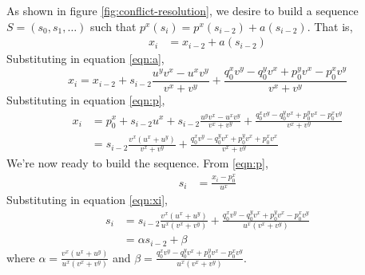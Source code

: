 \documentclass{egpubl}
\begin{document}
As shown in figure \ref{fig:conflict-resolution}, we desire to build a sequence $S=(s_0, s_1, \dots)$ such that $p^x(s_i) = p^x(s_{i-2}) + a(s_{i-2})$. %
That is,
\begin{align}
x_i &= x_{i-2} + a(s_{i-2}) \label{eqn:xi_init}
\end{align}
Substituting in equation \eqref{eqn:a},
\begin{equation}
x_i = x_{i-2} + s_{i-2}\frac{u^yv^x-u^xv^y}{v^x+v^y} + \frac{q_0^xv^y-q_0^yv^x+p_0^yv^x-p_0^xv^y}{v^x+v^y}
\end{equation}
Substituting in equation \eqref{eqn:p},
\begin{align}
x_i &= p_0^x+s_{i-2}u^x + s_{i-2}\frac{u^yv^x-u^xv^y}{v^x+v^y} + \frac{q_0^xv^y-q_0^yv^x+p_0^yv^x-p_0^xv^y}{v^x+v^y} \\
    &= s_{i-2}\frac{v^x(u^x+u^y)}{v^x+v^y} + \frac{q_0^xv^y-q_0^yv^x+p_0^yv^x+p_0^xv^x}{v^x+v^y} \label{eqn:xi}
\end{align}
We're now ready to build the sequence. From \eqref{eqn:p},
\begin{align}
s_i &= \frac{x_i-p_0^x}{u^x}
\end{align}
Substituting in equation \eqref{eqn:xi},
\begin{align}
s_i &= s_{i-2}\frac{v^x(u^x+u^y)}{u^x(v^x+v^y)} + \frac{q_0^xv^y-q_0^yv^x+p_0^yv^x-p_0^xv^y}{u^x(v^x+v^y)} \\
    &= \alpha s_{i-2} + \beta \label{eqn:si_rec}
\end{align}
where $\displaystyle \alpha=\frac{v^x(u^x+u^y)}{u^x(v^x+v^y)}$ and $\displaystyle \beta=\frac{q_0^xv^y-q_0^yv^x+p_0^yv^x-p_0^xv^y}{u^x(v^x+v^y)}$.
\end{document}
